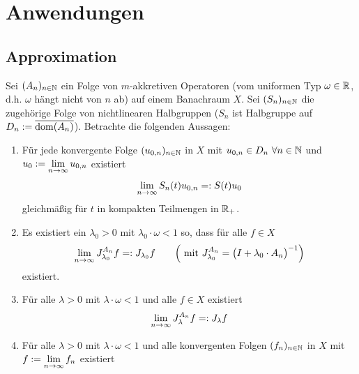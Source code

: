 
\chapter{Anwendungen} %
\section{Approximation}

\begin{theorem}\label{theoremTrotterKatoMiyadera}\enter
	Sei $(A_n)_{n\in\mathbb{N}}$ ein Folge von $m$-akkretiven Operatoren (vom uniformen Typ $\omega\in\mathbb{R}$, d.h. $\omega$ hängt nicht von $n$ ab) auf einem Banachraum $X$.
	Sei $(S_n)_{n\in\mathbb{N}}$ die zugehörige Folge von nichtlinearen Halbgruppen ($S_n$ ist Halbgruppe auf $D_n:=\overline{\operatorname{dom}(A_n)}$). 
	Betrachte die folgenden Aussagen:
	\begin{enumerate}[label=(\roman*)]
		\item Für jede konvergente Folge $(u_{0,n})_{n\in\mathbb{N}}$ in $X$ mit $u_{0,n}\in D_n~\forall n\in\mathbb{N}$ und\\ $u_0:=\lim\limits_{n\to\infty} u_{0,n}$ existiert
		\begin{align*}
			\lim\limits_{n\to\infty} S_n(t) u_{0,n}=:S(t) u_0
		\end{align*}
		gleichmäßig für $t$ in kompakten Teilmengen in $\mathbb{R}_+$.
		\item Es existiert ein $\lambda_0>0$ mit $\lambda_0\cdot\omega<1$ so, dass für alle $f\in X$
		\begin{align*}
			\lim\limits_{n\to\infty} J_{\lambda_0}^{A_n} f=:J_{\lambda_0}f\qquad \Big(\text{ mit } J_{\lambda_0}^{A_n}=\big(I+\lambda_0\cdot A_n\big)^{-1}\Big)
		\end{align*}
		existiert.
		\item Für alle $\lambda>0$ mit $\lambda\cdot\omega<1$ und alle $f\in X$ existiert
		\begin{align*}
			\lim\limits_{n\to\infty} J_\lambda^{A_n} f=:J_\lambda f
		\end{align*}
		\item Für alle $\lambda>0$ mit $\lambda\cdot\omega<1$ und alle konvergenten Folgen $(f_n)_{n\in\mathbb{N}}$ in $X$ mit $f:=\lim\limits_{n\to\infty} f_n$ existiert
		\begin{align*}

\end{align*}
\end{enumerate}
\end{theorem}
